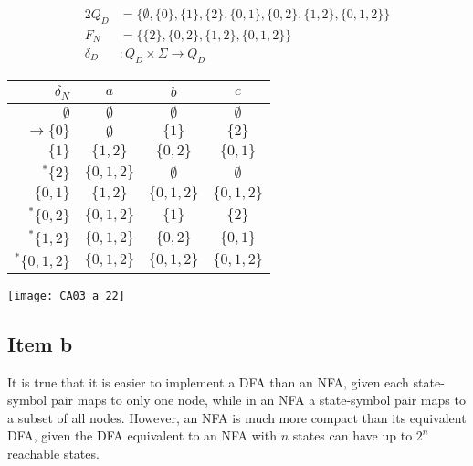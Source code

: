 {\begin{center}
\begin{minipage}[c]{0.55\textwidth}
\begin{alignat*}{2}
			Q_D      &= \{\emptyset, \{0\},\{1\},\{2\}, \{0,1\},\{0,2\},\{1,2\},\{0,1,2\}\}\\
			F_N      &= \{\{2\},\{0,2\},\{1,2\},\{0,1,2\}\}\\
			\delta_D &\colon Q_D \times \Sigma \rightarrow Q_D		
		\end{alignat*}
	\end{minipage}%
	\begin{minipage}[c]{0.40\textwidth}
		\begin{tabular}{ r | c c c }
			$\delta_N$ & $a$ & $b$ & $c$ \\ \hline
			$\emptyset        $ & $\emptyset$ & $\emptyset$ & $\emptyset$ \\
			$\rightarrow \{0\}$ & $\emptyset$ & $\{1\}    $ & $\{2\}  $\\
			$            \{1\}$ & $\{1,2\}  $ & $\{0,2\}  $ & $\{0,1\}$\\
			$^\ast       \{2\}$ & $\{0,1,2\}$ & $\emptyset$ & $\emptyset$\\
			$          \{0,1\}$ & $\{1,2\}  $ & $\{0,1,2\}$ & $\{0,1,2\}$\\
			$^\ast     \{0,2\}$ & $\{0,1,2\}$ & $\{1    \}$ & $\{2    \}$\\
			$^\ast     \{1,2\}$ & $\{0,1,2\}$ & $\{0,2  \}$ & $\{0,1\}$\\
			$^\ast   \{0,1,2\}$ & $\{0,1,2\}$ & $\{0,1,2\}$ & $\{0,1,2\}$
		\end{tabular}
	\end{minipage}%
\end{center}
\begin{center} \texttt{[image: CA03\_a\_22]} \end{center}
\subsection{Item b}
It is true that it is easier to implement a DFA than an NFA, given each state-symbol pair maps to only one node, while in an NFA a state-symbol pair maps to a subset of all nodes. However, an NFA is much more compact than its equivalent DFA, given the DFA equivalent to an NFA with $n$ states can have up to $2^n$ reachable states.
}